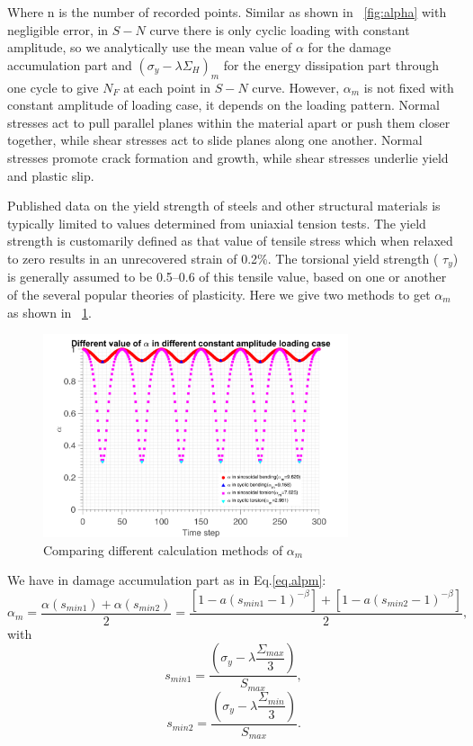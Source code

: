 \documentclass[3p,times,number,review]{elsarticle}
\newcommand{\figref}[1]{\figurename~\ref{#1}}
\begin{document}
Where n is the number of recorded points. Similar as shown in \figref{fig:alpha} with negligible error, in $S-N$ curve there is only cyclic loading with constant amplitude, so we analytically use the mean value of $\alpha$ for the damage accumulation part and $\left(\sigma_y-\lambda \Sigma_H\right)_m$ for the energy dissipation part through one cycle to give $N_F$ at each point in $S-N$ curve. However, $\alpha_m$ is not fixed with constant amplitude of loading case, it depends on the loading pattern. Normal stresses act to pull parallel planes within the material apart or push them closer
together, while shear stresses act to slide planes along one another. Normal stresses promote
crack formation and growth, while shear stresses underlie yield and plastic slip. 

Published data on the yield strength of steels and
other structural materials is typically limited to values
determined from uniaxial tension tests. The yield strength is
customarily defined as that value of tensile stress which when
relaxed to zero results in an unrecovered strain of 0.2\%. The
torsional yield strength ( $\tau_y$) is generally assumed to be 0.5–0.6
of this tensile value, based on one or another of the several
popular theories of plasticity\cite{dieter1961mechanical}.
 Here we give two methods to get $\alpha_m$ as shown in \figref{fig.alpmean}.

\begin{figure}[!h]
	\centering
	\includegraphics[width=0.8\textwidth]{figures//alp_mean_methods.png} 
	\caption{Comparing different calculation methods of $\alpha_m$}
	\label{fig.alpmean}
\end{figure}



We have in damage accumulation part as in Eq.\eqref{eq.alpm}:
\begin{equation}
\alpha_m=\dfrac{\alpha(s_{min1})+\alpha(s_{min2})}{2}=\dfrac{\left[ 1-a\left(  s_{min1}-1 \right) ^{-\beta}\right] +\left[ 1-a\left(  s_{min2}-1 \right) ^{-\beta}\right] }{2},
\label{eq.alpm}
\end{equation}
with
$$s_{min1}=\dfrac{\left(\sigma_y-\lambda \dfrac{\Sigma_{max}}{3}\right)}{S_{max}},$$
$$s_{min2}=\dfrac{\left(\sigma_y-\lambda \dfrac{\Sigma_{min}}{3}\right)}{S_{max}}.$$
\end{document}
